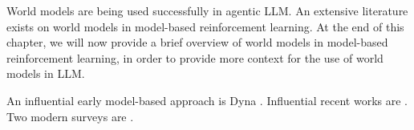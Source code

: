 World models are being used successfully in agentic LLM. An extensive literature exists on world models in model-based reinforcement learning. At the end of this chapter, we will now provide a brief overview of world models in model-based reinforcement learning, in order to provide more context for the use of world models  in LLM. 

An influential early model-based approach is Dyna \citep{sutton1991dyna}. Influential recent works are \citep{ha2018world,hafner2020mastering}. Two modern surveys  are \citet{moerland2023model,plaat2023high}.

